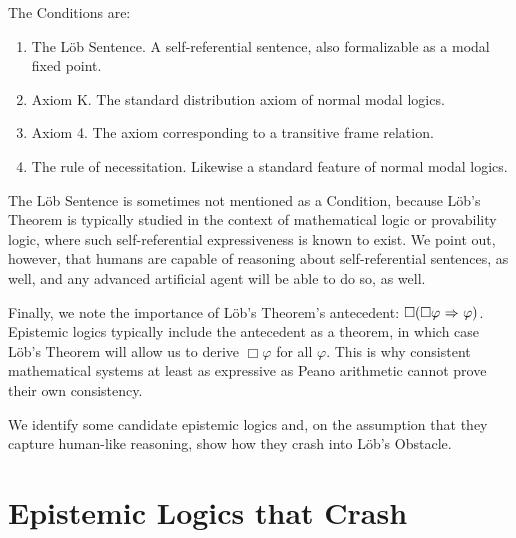 The Conditions are:
\begin{enumerate}
	\item The L\"ob Sentence. A self-referential sentence, also formalizable as a modal fixed point.
	\item Axiom K. The standard distribution axiom of normal modal logics.
	\item Axiom 4. The axiom corresponding to a transitive frame relation.
	\item The rule of necessitation. Likewise a standard feature of normal modal logics.
\end{enumerate} 

The L\"ob Sentence is sometimes not mentioned as a Condition, because L\"ob's Theorem is typically studied in the context of mathematical logic or provability logic, where such self-referential expressiveness is known to exist. We point out, however, that humans are capable of reasoning about self-referential sentences, as well, and any advanced artificial agent will be able to do so, as well. 

Finally, we note the importance of L\"ob's Theorem's antecedent: $\Box(\Box\varphi {\ \Rightarrow \ } \varphi)$. Epistemic logics typically include the antecedent as a theorem, in which case L\"ob's Theorem will allow us to derive $\Box\varphi$ for all $\varphi$. This is why consistent mathematical systems at least as expressive as Peano arithmetic cannot prove their own consistency. 

We identify some candidate epistemic logics and, on the assumption that they capture human-like reasoning, show how they crash into L\"ob's Obstacle.

\section{Epistemic Logics that Crash}
\label{sec:crashing_logics}
